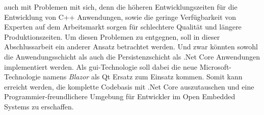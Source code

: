 auch mit Problemen mit sich, denn die höheren Entwicklungszeiten für die Entwicklung von C++
Anwendungen, sowie die geringe Verfügbarkeit von Experten auf dem Arbeitsmarkt sorgen für
schlechtere Qualität und längere Produktionszeiten.
\newline
\newline
Um diesen Problemen zu entgegnen, soll in dieser Abschlussarbeit ein anderer Ansatz betrachtet
werden. Und zwar könnten sowohl die Anwendungsschicht als auch die Persistenzschicht als .Net
Core Anwendungen implementiert werden. Als \ac{gui}-Technologie soll dabei die neue
Microsoft-Technologie namens \emph{Blazor} als Qt Ersatz zum Einsatz kommen. Somit kann erreicht
werden, die komplette Codebasis mit .Net Core auszutauschen und eine Programmier-freundlichere
Umgebung für Entwickler im Open Embedded Systems zu erschaffen.



